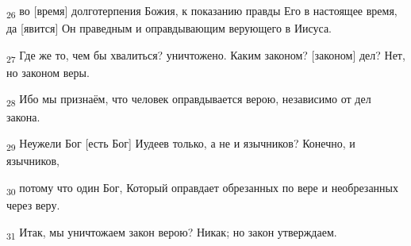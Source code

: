 \begin{tcolorbox}
\textsubscript{26} во [время] долготерпения Божия, к показанию правды Его в настоящее время, да [явится] Он праведным и оправдывающим верующего в Иисуса.
\end{tcolorbox}
\begin{tcolorbox}
\textsubscript{27} Где же то, чем бы хвалиться? уничтожено. Каким законом? [законом] дел? Нет, но законом веры.
\end{tcolorbox}
\begin{tcolorbox}
\textsubscript{28} Ибо мы признаём, что человек оправдывается верою, независимо от дел закона.
\end{tcolorbox}
\begin{tcolorbox}
\textsubscript{29} Неужели Бог [есть Бог] Иудеев только, а не и язычников? Конечно, и язычников,
\end{tcolorbox}
\begin{tcolorbox}
\textsubscript{30} потому что один Бог, Который оправдает обрезанных по вере и необрезанных через веру.
\end{tcolorbox}
\begin{tcolorbox}
\textsubscript{31} Итак, мы уничтожаем закон верою? Никак; но закон утверждаем.
\end{tcolorbox}

